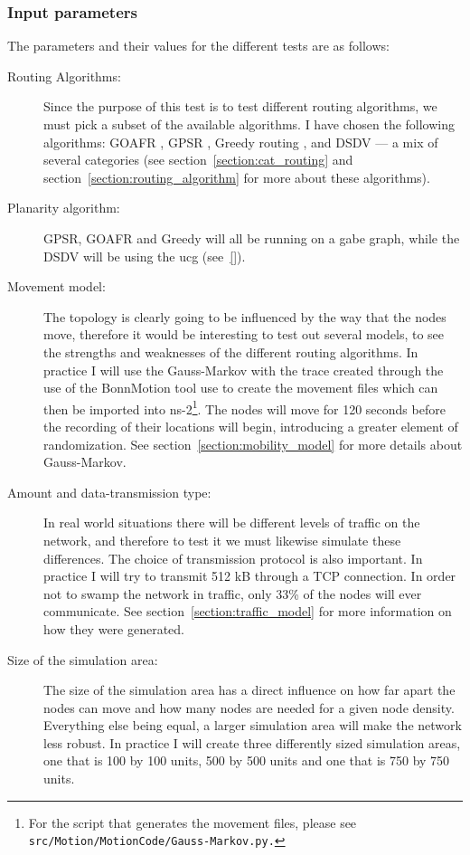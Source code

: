 \subsubsection{Input parameters}
\label{section:input_parameters}
The parameters and their values for the different tests are as follows:
\begin{description}
\item[Routing Algorithms:] Since the purpose of this test is to test different routing algorithms, we must pick a subset of the available algorithms. I have chosen the following algorithms: GOAFR \cite{gopher}, GPSR \cite{gpsr}, Greedy routing \cite{gopher}, and DSDV \cite{DSDV} --- a mix of several categories (see section~\ref{section:cat_routing} and section~\ref{section:routing_algorithm} for more about these algorithms).

\item[Planarity algorithm:] GPSR, GOAFR and Greedy will all be running on a \ac{gabe} graph, while the DSDV will be using the \ac{ucg} (see~\ref{}).

\item[Movement model:] The topology is clearly going to be influenced by the way that the nodes move, therefore it would be interesting to test out several models, to see the strengths and weaknesses of the different routing algorithms. In practice I will use  the Gauss-Markov \cite{MobilityAdHocResearch} with the trace created through the use of the BonnMotion tool \cite{toilers} use to create the movement files which can then be imported into ns-2\footnote{For the script that generates the movement files, please see \texttt{src/Motion/MotionCode/Gauss-Markov.py.}}. The nodes will move for 120 seconds before the recording of their locations will begin, introducing a greater element of randomization. See section~\ref{section:mobility_model} for more details about Gauss-Markov.

\item[Amount and data-transmission type:] In real world situations there will be different levels of traffic on the network, and therefore to test it we must likewise simulate these differences. The choice of transmission protocol is also important. In practice I will try to transmit 512 kB through a TCP connection. In order not to swamp the network in traffic, only 33\% of the nodes will ever communicate. See section~\ref{section:traffic_model} for more information on how they were generated.

\item[Size of the simulation area:] The size of the simulation area has a direct influence on how far apart the nodes can move and how many nodes are needed for a given node density. Everything else being equal, a larger simulation area will make the network less robust. In practice I will create three differently sized simulation areas, one that is 100 by 100 units, 500 by 500 units and one that is 750 by 750 units.


\end{description}
